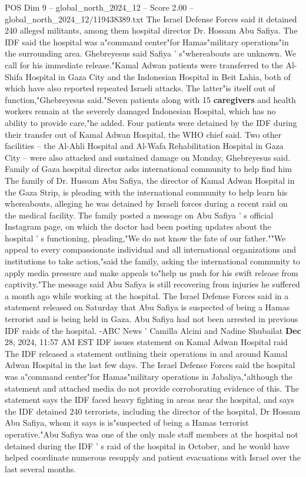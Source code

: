 \begin{textsample}{POS Dim 9 – global\_north\_2024\_12 – Score 2.00 – global\_north\_2024\_12/119438389.txt}
The Israel Defense Forces said it detained 240 alleged militants, among them hospital director Dr.
Hossam Abu Safiya.
The IDF said the hospital was a"command center"for Hamas"military operations"in the surrounding area.
Ghebreyesus said Safiya ' s"whereabouts are unknown.
We call for his immediate release."Kamal Adwan patients were transferred to the Al-Shifa Hospital in Gaza City and the Indonesian Hospital in Beit Lahia, both of which have also reported repeated Israeli attacks.
The latter"is itself out of function,"Ghebreyesus said."Seven patients along with 15 \textbf{caregivers} and health workers remain at the severely damaged Indonesian Hospital, which has no ability to provide care,"he added.
Four patients were detained by the IDF during their transfer out of Kamal Adwan Hospital, the WHO chief said.
Two other facilities -- the Al-Ahli Hospital and Al-Wafa Rehabilitation Hospital in Gaza City -- were also attacked and sustained damage on Monday, Ghebreyesus said.
Family of Gaza hospital director asks international community to help find him The family of Dr.
Hussam Abu Safiya, the director of Kamal Adwan Hospital in the Gaza Strip, is pleading with the international community to help learn his whereabouts, alleging he was detained by Israeli forces during a recent raid on the medical facility.
The family posted a message on Abu Safiya ' s official Instagram page, on which the doctor had been posting updates about the hospital ' s functioning, pleading,"We do not know the fate of our father.""We appeal to every compassionate individual and all international organizations and institutions to take action,"said the family, asking the international community to apply media pressure and make appeals to"help us push for his swift release from captivity."The message said Abu Safiya is still recovering from injuries he suffered a month ago while working at the hospital.
The Israel Defense Forces said in a statement released on Saturday that Abu Safiya is suspected of being a Hamas terrorist and is being held in Gaza.
Abu Safiya had not been arrested in previous IDF raids of the hospital. -ABC News ' Camilla Alcini and Nadine Shubailat \textbf{Dec} 28, 2024, 11:57 AM EST IDF issues statement on Kamal Adwan Hospital raid The IDF released a statement outlining their operations in and around Kamal Adwan Hospital in the last few days.
The Israel Defense Forces said the hospital was a"command center"for Hamas"military operations in Jabaliya,"although the statement and attached media do not provide corroborating evidence of this.
The statement says the IDF faced heavy fighting in areas near the hospital, and says the IDF detained 240 terrorists, including the director of the hospital, Dr Hossam Abu Safiya, whom it says is is"suspected of being a Hamas terrorist operative."Abu Safiya was one of the only male staff members at the hospital not detained during the IDF ' s raid of the hospital in October, and he would have helped coordinate numerous resupply and patient evacuations with Israel over the last several months.

\end{textsample}
